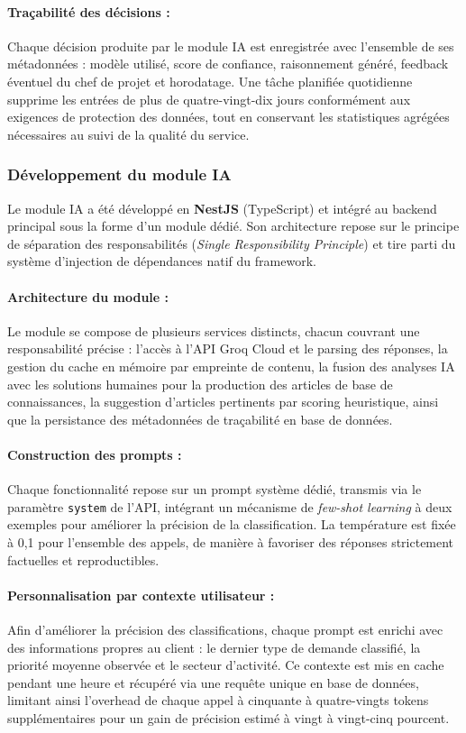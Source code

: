 \paragraph{Traçabilité des décisions :}
Chaque décision produite par le module IA est enregistrée avec
l'ensemble de ses métadonnées : modèle utilisé, score de confiance,
raisonnement généré, feedback éventuel du chef de projet et
horodatage. Une tâche planifiée quotidienne supprime les entrées
de plus de quatre-vingt-dix jours conformément aux exigences de
protection des données, tout en conservant les statistiques agrégées
nécessaires au suivi de la qualité du service.

\subsubsection{Développement du module IA}

Le module IA a été développé en \textbf{NestJS} (TypeScript) et
intégré au backend principal sous la forme d'un module dédié. Son
architecture repose sur le principe de séparation des responsabilités
(\textit{Single Responsibility Principle}) et tire parti du système
d'injection de dépendances natif du framework.

\paragraph{Architecture du module :}
Le module se compose de plusieurs services distincts, chacun couvrant
une responsabilité précise : l'accès à l'API Groq Cloud et le parsing
des réponses, la gestion du cache en mémoire par empreinte de contenu,
la fusion des analyses IA avec les solutions humaines pour la
production des articles de base de connaissances, la suggestion
d'articles pertinents par scoring heuristique, ainsi que la
persistance des métadonnées de traçabilité en base de données.

\paragraph{Construction des prompts :}
Chaque fonctionnalité repose sur un prompt système dédié, transmis
via le paramètre \texttt{system} de l'API, intégrant un mécanisme
de \textit{few-shot learning} à deux exemples pour améliorer la
précision de la classification. La température est fixée à 0,1
pour l'ensemble des appels, de manière à favoriser des réponses
strictement factuelles et reproductibles.

\paragraph{Personnalisation par contexte utilisateur :}
Afin d'améliorer la précision des classifications, chaque prompt
est enrichi avec des informations propres au client : le dernier
type de demande classifié, la priorité moyenne observée et le
secteur d'activité. Ce contexte est mis en cache pendant une heure
et récupéré via une requête unique en base de données, limitant
ainsi l'overhead de chaque appel à cinquante à quatre-vingts
tokens supplémentaires pour un gain de précision estimé à
vingt à vingt-cinq pourcent.

